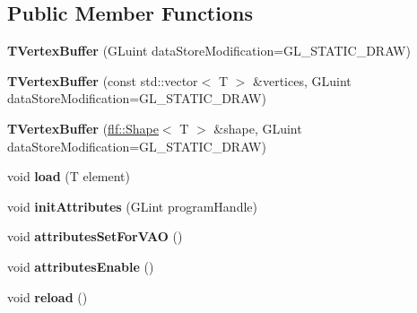 \subsection*{Public Member Functions}
\begin{DoxyCompactItemize}
\item 
\mbox{\label{classflw_1_1flc_1_1TVertexBuffer_a25fe31ad21ba02a3b187fe874795143e}} 
{\bfseries T\+Vertex\+Buffer} (G\+Luint data\+Store\+Modification=G\+L\+\_\+\+S\+T\+A\+T\+I\+C\+\_\+\+D\+R\+AW)
\item 
\mbox{\label{classflw_1_1flc_1_1TVertexBuffer_a2e8be908b0f56009547c9b9e501147ca}} 
{\bfseries T\+Vertex\+Buffer} (const std\+::vector$<$ T $>$ \&vertices, G\+Luint data\+Store\+Modification=G\+L\+\_\+\+S\+T\+A\+T\+I\+C\+\_\+\+D\+R\+AW)
\item 
\mbox{\label{classflw_1_1flc_1_1TVertexBuffer_acb95e0c4a681bf16a57a348fef27fccb}} 
{\bfseries T\+Vertex\+Buffer} (\hyperlink{classflw_1_1flf_1_1Shape}{flf\+::\+Shape}$<$ T $>$ \&shape, G\+Luint data\+Store\+Modification=G\+L\+\_\+\+S\+T\+A\+T\+I\+C\+\_\+\+D\+R\+AW)
\item 
\mbox{\label{classflw_1_1flc_1_1TVertexBuffer_a2093c68db61fd6a82378e94bb6a5603d}} 
void {\bfseries load} (T element)
\item 
\mbox{\label{classflw_1_1flc_1_1TVertexBuffer_adffb468132a9a983e72cbc3c67408554}} 
void {\bfseries init\+Attributes} (G\+Lint program\+Handle)
\item 
\mbox{\label{classflw_1_1flc_1_1TVertexBuffer_a9b10436de21ac6b51c77a0d5de80bc6c}} 
void {\bfseries attributes\+Set\+For\+V\+AO} ()
\item 
\mbox{\label{classflw_1_1flc_1_1TVertexBuffer_a55e8bedfc69a84a76a77a76c0c328195}} 
void {\bfseries attributes\+Enable} ()
\item 
\mbox{\label{classflw_1_1flc_1_1TVertexBuffer_a91f037ceed8a6ed2a0192560eca4467b}} 
void {\bfseries reload} ()

\end{DoxyCompactItemize}
